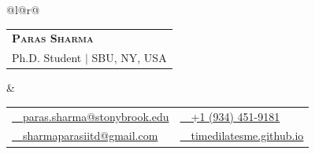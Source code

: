 \begin{tabular*}{\textwidth}{@{}l@{\extracolsep{\fill}}r@{}}
  \begin{tabular}[c]{@{}l@{}}{\huge \bfseries\scshape Paras Sharma} \\ \large Ph.D. Student $|$ SBU, NY, USA\end{tabular} &
  \begin{tabular}[c]{@{}l@{\hspace{2.2em}}l@{}}
    \href{mailto:paras.sharma@stonybrook.edu}{\faEnvelope\ \ paras.sharma@stonybrook.edu} & \href{tel:+19344519181}{\faPhone\ \ +1 (934) 451-9181} \\
    \href{mailto:sharmaparasiitd@gmail.com}{\faEnvelopeSquare\ \ sharmaparasiitd@gmail.com} & \href{https://timedilatesme.github.io}{\faGlobe\ \ timedilatesme.github.io}
  \end{tabular}
\end{tabular*}
